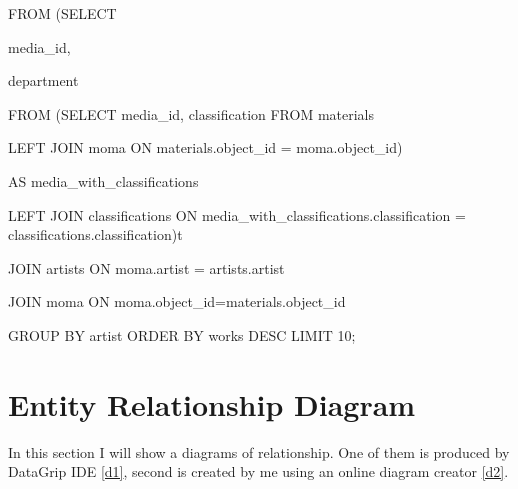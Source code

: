 \documentclass[journal,transmag]{IEEEtran}
\begin{document}
FROM (SELECT

  media\_id,

  department

FROM (SELECT media\_id, classification FROM materials

         LEFT JOIN moma ON materials.object\_id = moma.object\_id)

  AS media\_with\_classifications

  LEFT JOIN classifications ON media\_with\_classifications.classification = classifications.classification)t

JOIN artists ON moma.artist = artists.artist

  JOIN moma ON moma.object\_id=materials.object\_id

GROUP BY artist ORDER BY works DESC LIMIT 10;


\section{Entity Relationship Diagram}

In this section I will show a diagrams of relationship. One of them is produced by DataGrip IDE \ref{d1}, second is created by me using an online diagram creator \ref{d2}. 


\begin{figure}[t]
\end{figure}
\end{document}
